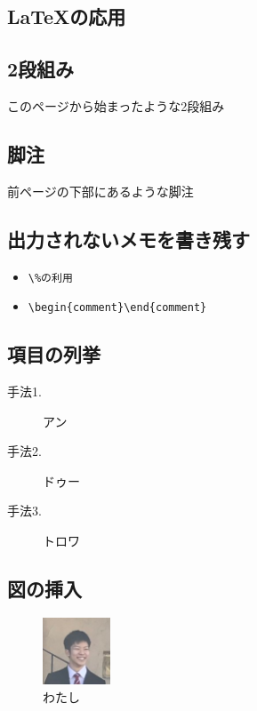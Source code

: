 \documentclass[a4paper, papersize]{jsarticle}
\begin{document}
\newpage
\begin{multicols}{2}


\section{LaTeXの応用}


\subsection{2段組み}
このページから始まったような2段組み

\subsection{脚注}
前ページの下部にあるような脚注

\subsection{出力されないメモを書き残す}
\begin{itemize}
\item \verb|\%の利用|
\item \verb|\begin{comment}\end{comment}|
\end{itemize}


\subsection{項目の列挙}
\begin{description}
\item [手法1.] アン
\item [手法2.] ドゥー
\item [手法3.] トロワ
\end{description}


\subsection{図の挿入}
\renewcommand{\figurename}{図}
\setcounter{figure}{2}
\begin{figure}[H]
 \centering
   \includegraphics[width=20mm]{figures/Sample.jpg}
 \caption{わたし}
 \label{me}
\end{figure}
\noindent


\end{multicols}
\end{document}
